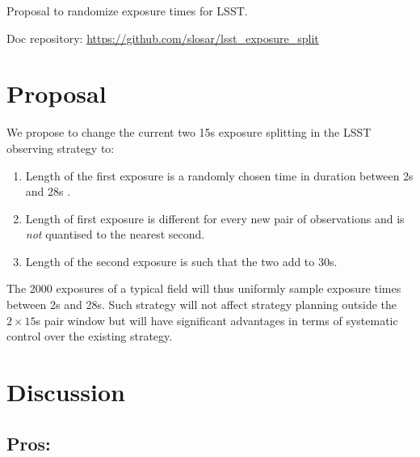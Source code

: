 \documentclass[12pt, a4paper]{article}
\begin{document}
\begin{center}
{\Huge
  Proposal to randomize exposure times for LSST.
}
\end{center}



{\small
Doc repository: \url{https://github.com/slosar/lsst_exposure_split}
}

\section*{Proposal}

We propose to change the current two 15s exposure splitting in the
LSST observing strategy to:

\begin{enumerate}
\item Length of the first exposure is a randomly chosen time in
  duration between 2s and 28s .

\item Length of first exposure is different for every new pair of
  observations and is \emph{not} quantised to the nearest second.

\item Length of the second exposure is such that the two add to 30s.
\end{enumerate}

The 2000 exposures of a typical field will thus uniformly sample
exposure times between 2s and 28s. Such strategy will not affect
strategy planning outside the $2\times 15$s pair window but will have significant
advantages in terms of systematic control over the existing strategy.


\section*{Discussion}


\subsection*{Pros:}
\end{document}
